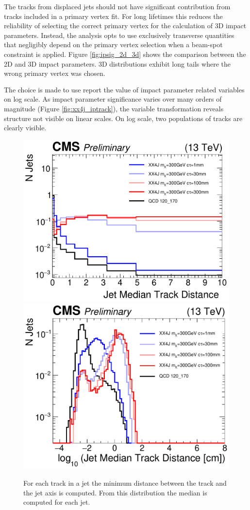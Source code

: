 The tracks from displaced jets should not have significant contribution from tracks included in a primary vertex fit.
For long lifetimes this reduces the reliability of selecting the correct
primary vertex for the calculation of 3D impact parameters. Instead, the analysis opts to use exclusively transverse quantities that negligibly depend on the primary
 vertex selection when a beam-spot constraint is applied.  
Figure \ref{fig:ipsig_2d_3d} shows the comparison between the 2D and 3D
impact parameters. 3D distributions exhibit long tails where the wrong 
primary vertex was chosen. 

The choice is made to use report the value of impact parameter related variables
 on log scale. As impact parameter significance varies over many orders of 
magnitude (Figure \ref{fig:xx4j_iptrack}), the variable transformation 
reveals structure not visible on linear scales. On log scale, two populations 
of tracks are clearly visible.

\begin{figure}
\begin{center}
\includegraphics[width=.45\textwidth]{figures/an_jetid/VTX_MATCH_IP/XX4J_jetMedianDistance}
\includegraphics[width=.45\textwidth]{figures/an_jetid/VTX_MATCH_IP/XX4J_log_jetMedianTrackDist}
\end{center}
\caption{For each track in a jet the minimum distance between the track and the jet axis is computed. From this distribution
the median is computed for each jet.}
\label{fig:jetDistance}
\end{figure}

